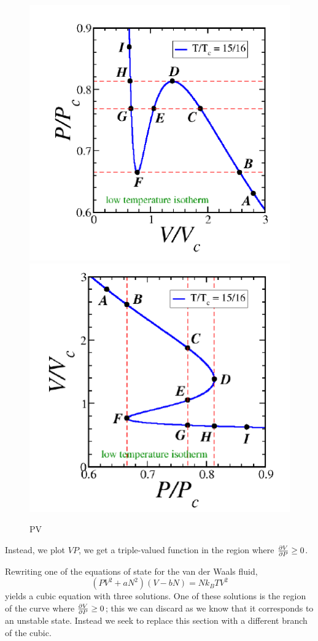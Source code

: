 \begin{figure}[!htbp]
	\begin{center}
\includegraphics[scale=.7]{diagrams/phase/pv.png}\includegraphics[scale=.7]{diagrams/phase/vp.png}
	\end{center}
	\caption{PV}\label{fig16:pv}
\end{figure}

Instead, we plot \(VP\), we get a triple-valued function in the region where \(\frac{\partial V}{\partial P}\geq0\).

Rewriting one of  the equations of state for the van der Waals fluid,
\begin{equation}
	(PV^2+aN^2)(V-bN)=Nk_BTV^2
\end{equation}
yields a cubic equation with three solutions. 
One of these solutions is the region of the curve where \(\frac{\partial V}{\partial P}\geq 0\); this we can discard as we know that it corresponds to an unstable state.
Instead we seek to replace this section with a different branch of the cubic.

